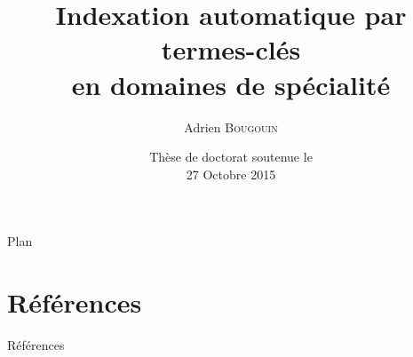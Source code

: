 \documentclass[10pt, xcolor={usenames, dvipsnames}]{beamer}
\title{Indexation automatique par termes-clés\\en domaines de spécialité}
\author{Adrien \textsc{Bougouin}}
\institute{\normalsize{Université de Nantes, LINA}}
\date{Thèse de doctorat soutenue le\\27 Octobre 2015}
\begin{document}
  \begin{frame}
    \titlepage
  \end{frame}

  
  \begin{frame}{Plan}
    \tableofcontents
  \end{frame}
  
  
  
  
  \section*{Références}
    \begin{frame}[allowframebreaks]{Références}
      \def\newblock{\hskip .11em plus .33em minus .07em}
      
      
    \end{frame}
  
\end{document}
